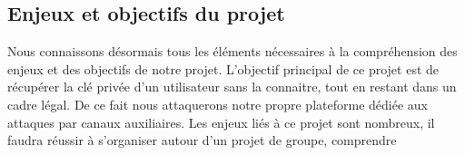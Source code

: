 \subsection{Enjeux et objectifs du projet}
Nous connaissons désormais tous les éléments nécessaires à la compréhension des enjeux et des objectifs de notre projet. L'objectif principal de ce projet est de récupérer la clé privée d'un utilisateur sans la connaitre, tout en restant dans un cadre légal. De ce fait nous attaquerons notre propre plateforme dédiée aux attaques par canaux auxiliaires. Les enjeux liés à ce projet sont nombreux, il faudra réussir à s’organiser autour d'un projet de groupe, comprendre

